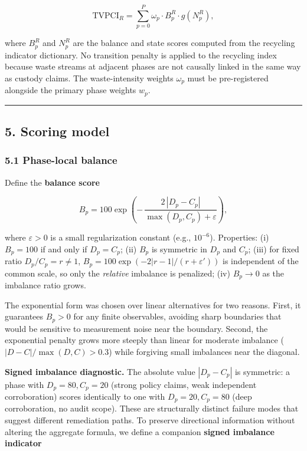 \documentclass[
  11pt,
  letterpaper,
]{article}
\begin{document}
\[\mathrm{TVPCI}_R = \sum_{p=0}^{P} \omega_p \cdot B^R_p \cdot g(N^R_p),\]

where \(B^R_p\) and \(N^R_p\) are the balance and state scores computed
from the recycling indicator dictionary. No transition penalty is
applied to the recycling index because waste streams at adjacent phases
are not causally linked in the same way as custody claims. The
waste-intensity weights \(\omega_p\) must be pre-registered alongside
the primary phase weights \(w_p\).

\begin{center}\rule{0.5\linewidth}{0.5pt}\end{center}

\subsection{5. Scoring model}\label{scoring-model}

\subsubsection{5.1 Phase-local balance}\label{phase-local-balance}

Define the \textbf{balance score}

\[B_p = 100 \exp\!\left(-\,\frac{2\,|D_p - C_p|}{\max(D_p, C_p) + \varepsilon}\right),\]

where \(\varepsilon > 0\) is a small regularization constant (e.g.,
\(10^{-6}\)). Properties: (i) \(B_p = 100\) if and only if
\(D_p = C_p\); (ii) \(B_p\) is symmetric in \(D_p\) and \(C_p\); (iii)
for fixed ratio \(D_p/C_p = r \neq 1\),
\(B_p = 100 \exp(-2|r-1|/(r+\varepsilon'))\) is independent of the
common scale, so only the \emph{relative} imbalance is penalized; (iv)
\(B_p \rightarrow 0\) as the imbalance ratio grows.

The exponential form was chosen over linear alternatives for two
reasons. First, it guarantees \(B_p > 0\) for any finite observables,
avoiding sharp boundaries that would be sensitive to measurement noise
near the boundary. Second, the exponential penalty grows more steeply
than linear for moderate imbalance (\(|D-C|/\max(D,C) > 0.3\)) while
forgiving small imbalances near the diagonal.

\textbf{Signed imbalance diagnostic.} The absolute value \(|D_p - C_p|\)
is symmetric: a phase with \(D_p = 80, C_p = 20\) (strong policy claims,
weak independent corroboration) scores identically to one with
\(D_p = 20, C_p = 80\) (deep corroboration, no audit scope). These are
structurally distinct failure modes that suggest different remediation
paths. To preserve directional information without altering the
aggregate formula, we define a companion \textbf{signed imbalance
indicator}
\end{document}
